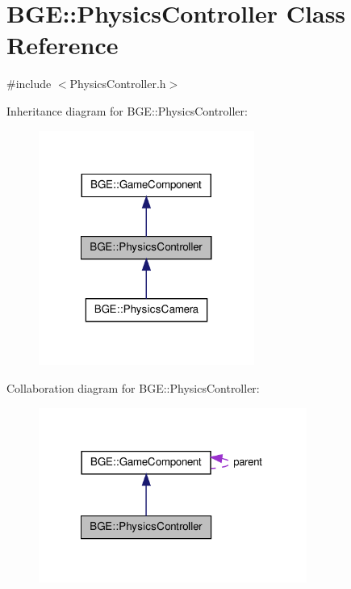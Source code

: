 \hypertarget{class_b_g_e_1_1_physics_controller}{\section{B\-G\-E\-:\-:Physics\-Controller Class Reference}
\label{class_b_g_e_1_1_physics_controller}
}


{\ttfamily \#include $<$Physics\-Controller.\-h$>$}



Inheritance diagram for B\-G\-E\-:\-:Physics\-Controller\-:
\nopagebreak
\begin{figure}[H]
\begin{center}
\leavevmode
\includegraphics[width=200pt]{class_b_g_e_1_1_physics_controller__inherit__graph}
\end{center}
\end{figure}


Collaboration diagram for B\-G\-E\-:\-:Physics\-Controller\-:
\nopagebreak
\begin{figure}[H]
\begin{center}
\leavevmode
\includegraphics[width=249pt]{class_b_g_e_1_1_physics_controller__coll__graph}
\end{center}
\end{figure}
